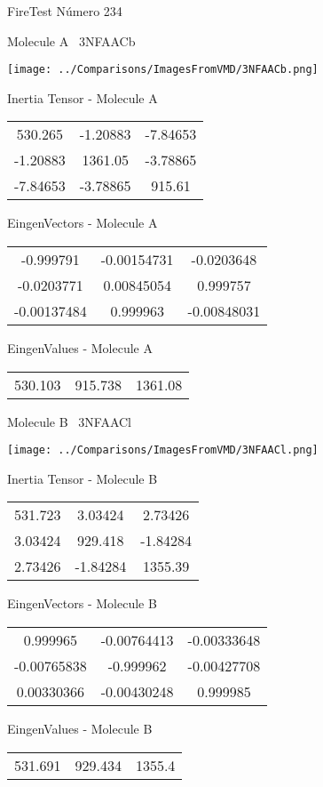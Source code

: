 \vtab[-3cm]
\begin{center}
{\large FireTest \tab Número 234}
\end{center}
\begin{multicols}{2}
\begin{center}

Molecule A \
3NFAACb

\texttt{[image: ../Comparisons/ImagesFromVMD/3NFAACb.png]}

Inertia Tensor - Molecule A \\
\begin{tabular}{|c c c|}
530.265	 & 	-1.20883	 & 	-7.84653	 \\
-1.20883	 & 	1361.05	 & 	-3.78865	 \\
-7.84653	 & 	-3.78865	 & 	915.61
\end{tabular}

\vtab
 EingenVectors - Molecule A     \\
\begin{tabular}{|c c c|}
-0.999791	 & 	-0.00154731	 & 	-0.0203648	 \\
-0.0203771	 & 	0.00845054	 & 	0.999757	 \\
-0.00137484	 & 	0.999963	 & 	-0.00848031
\end{tabular}

\vtab
 EingenValues - Molecule A     \\
\begin{tabular}{|c c c|}
530.103	 & 	915.738	 & 	1361.08	 \\
\end{tabular}
\columnbreak

Molecule B \
3NFAACl

\texttt{[image: ../Comparisons/ImagesFromVMD/3NFAACl.png]}

Inertia Tensor - Molecule B \\
\begin{tabular}{|c c c|}
531.723	 & 	3.03424	 & 	2.73426	 \\
3.03424	 & 	929.418	 & 	-1.84284	 \\
2.73426	 & 	-1.84284	 & 	1355.39
\end{tabular}

\vtab
 EingenVectors - Molecule B     \\
\begin{tabular}{|c c c|}
0.999965	 & 	-0.00764413	 & 	-0.00333648	 \\
-0.00765838	 & 	-0.999962	 & 	-0.00427708	 \\
0.00330366	 & 	-0.00430248	 & 	0.999985
\end{tabular}

\vtab
 EingenValues - Molecule B     \\
\begin{tabular}{|c c c|}
531.691	 & 	929.434	 & 	1355.4	 \\
\end{tabular}

\end{center}
\end{multicols}

